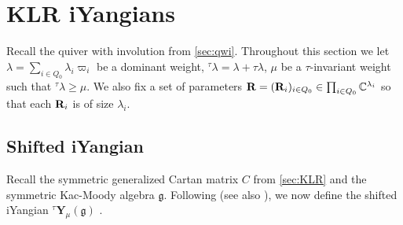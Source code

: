 \section{KLR iYangians}
\label{klrtY}
Recall the quiver with involution from \cref{sec:qwi}. 
Throughout this section we let $\lambda=\sum_{i\in Q_0}\lambda_i \varpi_i$ be a dominant weight, ${}^\tau \lambda=\lambda+\tau \lambda$, $\mu$ be a $\tau$-invariant weight such that ${}^\tau\lambda \geq \mu$. We also fix a set of parameters $\mathbf{R}=(\mathbf{R}_i)_{i\in Q_0}\in \prod_{i\in Q_0} \mathbb{C}^{\lambda_i}$ so that each $\mathbf{R}_i$ is of size $\lambda_i$.%

\subsection{Shifted iYangian}
 Recall the symmetric generalized Cartan matrix $C$ from \cref{sec:KLR} and the symmetric Kac-Moody algebra $\mathfrak{g}$. Following \cite[Def. 3.1]{SSX25} (see also \cite{LWW,LWW2}), we now define the shifted iYangian ${}^{\tau}\mathbf{Y}_{\mu}(\mathfrak{g})$ . 
